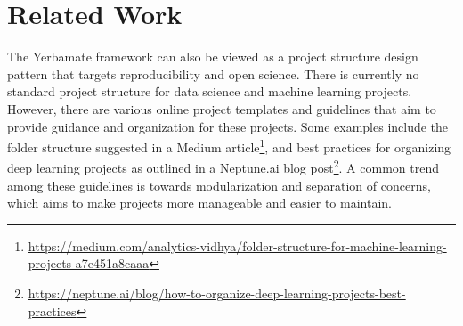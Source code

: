 \section{Related Work}

The Yerbamate framework can also be viewed as a project structure design pattern that targets reproducibility and open science.
There is currently no standard project structure for data science and machine learning projects. However, there are various online project templates and guidelines that aim to provide guidance and organization for these projects. Some examples include the folder structure suggested in a Medium article\footnote{\url{https://medium.com/analytics-vidhya/folder-structure-for-machine-learning-projects-a7e451a8caaa}}, and best practices for organizing deep learning projects as outlined in a Neptune.ai blog post\footnote{\url{https://neptune.ai/blog/how-to-organize-deep-learning-projects-best-practices}}. A common trend among these guidelines is towards modularization and separation of concerns, which aims to make projects more manageable and easier to maintain. 


